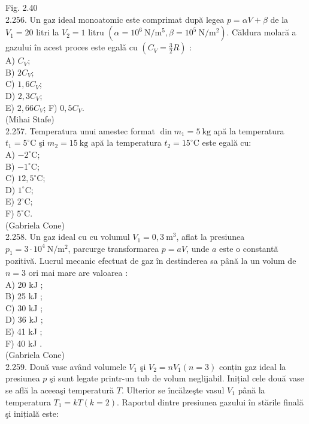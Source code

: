 \documentclass[10pt]{article}
\begin{document}
Fig. 2.40\\
2.256. Un gaz ideal monoatomic este comprimat după legea $p=\alpha V+\beta$ de la $V_{1}=20$ litri la $V_{2}=1$ litru $\left(\alpha=10^{6} \mathrm{~N} / \mathrm{m}^{5}, \beta=10^{5} \mathrm{~N} / \mathrm{m}^{2}\right)$. Căldura molară a gazului în acest proces este egalǎ cu $\left(C_{V}=\frac{3}{2} R\right)$ :\\
A) $C_{V}$;\\
B) $2 C_{V}$;\\
C) $1,6 C_{V}$;\\
D) $2,3 C_{V}$;\\
E) $2,66 C_{V}$; F) $0,5 C_{V}$.\\
(Mihai Stafe)\\
2.257. Temperatura unui amestec format $\operatorname{din} m_{1}=5 \mathrm{~kg}$ apă la temperatura $t_{1}=5^{\circ} \mathrm{C}$ şi $m_{2}=15 \mathrm{~kg}$ apă la temperatura $t_{2}=15^{\circ} \mathrm{C}$ este egală cu:\\
A) $-2^{\circ} \mathrm{C}$;\\
B) $-1^{\circ} \mathrm{C}$;\\
C) $12,5^{\circ} \mathrm{C}$;\\
D) $1^{\circ} \mathrm{C}$;\\
E) $2^{\circ} \mathrm{C}$;\\
F) $5^{\circ} \mathrm{C}$.\\
(Gabriela Cone)\\
2.258. Un gaz ideal cu cu volumul $V_{1}=0,3 \mathrm{~m}^{3}$, aflat la presiunea $p_{1}=3 \cdot 10^{4} \mathrm{~N} / \mathrm{m}^{2}$, parcurge transformarea $p=a V$, unde $a$ este o constantă pozitivă. Lucrul mecanic efectuat de gaz în destinderea sa până la un volum de $n=3$ ori mai mare are valoarea :\\
A) 20 kJ ;\\
B) 25 kJ ;\\
C) 30 kJ ;\\
D) 36 kJ ;\\
E) 41 kJ ;\\
F) 40 kJ .\\
(Gabriela Cone)\\
2.259. Două vase având volumele $V_{1}$ şi $V_{2}=n V_{1}(n=3)$ conțin gaz ideal la presiunea $p$ şi sunt legate printr-un tub de volum neglijabil. Inițial cele două vase se află la aceeaşi temperatură $T$. Ulterior se încălzeşte vasul $V_{1}$ până la\\
temperatura $T_{1}=k T(k=2)$. Raportul dintre presiunea gazului în stările finală şi inițială este:\\
\end{document}
